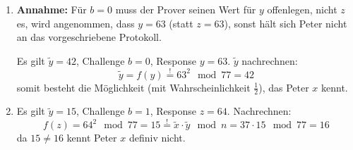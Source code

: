 \documentclass[DIN, pagenumber=false, fontsize=11pt, parskip=half]{scrartcl}
\begin{document}
    \begin{enumerate}[label=\alph*)]
        \item 
            \textbf{Annahme:} Für $b=0$ muss der Prover seinen Wert für $y$ offenlegen,
            nicht $z$ es, wird angenommen, dass $y=63$ (statt $z=63$), sonst hält sich
            Peter nicht an das vorgeschriebene Protokoll.

            Es gilt $\tilde{y}=42$, Challenge $b=0$, Response $y=63$.
            $\tilde{y}$ nachrechnen:
            \begin{equation}
                \tilde{y} = f(y) \stackrel{!}{=} 63^2 \mod 77 = 42
            \end{equation}
            somit besteht die Möglichkeit (mit Wahrscheinlichkeit $\frac{1}{2}$), das
            Peter $x$ kennt.
        \item Es gilt $\tilde{y}=15$, Challenge $b=1$, Response $z=64$.
            Nachrechnen:
            \begin{equation}
                f(z) = 64^2 \mod 77 = 15 \stackrel{!}{=} \tilde{x} \cdot \tilde{y} \mod n
                    = 37 \cdot 15 \mod 77 = 16
            \end{equation}
            da $15 \neq 16$ kennt Peter $x$ definiv nicht.
    \end{enumerate}
\end{document}
